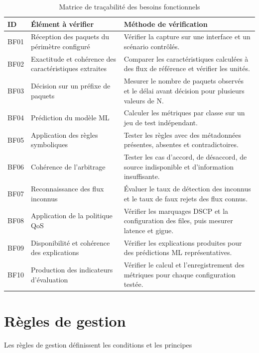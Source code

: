 \begin{table}[H]
\centering
\caption{Matrice de traçabilité des besoins fonctionnels}
\label{tab:tracabilite-bf}
\small
\begin{tabularx}{\textwidth}{|p{1.2cm}|X|X|}
\hline
\textbf{ID} & \textbf{Élément à vérifier} & \textbf{Méthode de vérification} \\
\hline
BF01 & Réception des paquets du périmètre configuré &
Vérifier la capture sur une interface et un scénario contrôlés. \\
\hline
BF02 & Exactitude et cohérence des caractéristiques extraites &
Comparer les caractéristiques calculées à des flux de référence et vérifier les unités. \\
\hline
BF03 & Décision sur un préfixe de paquets &
Mesurer le nombre de paquets observés et le délai avant décision pour plusieurs valeurs de N. \\
\hline
BF04 & Prédiction du modèle ML &
Calculer les métriques par classe sur un jeu de test indépendant. \\
\hline
BF05 & Application des règles symboliques &
Tester les règles avec des métadonnées présentes, absentes et contradictoires. \\
\hline
BF06 & Cohérence de l'arbitrage &
Tester les cas d'accord, de désaccord, de source indisponible et d'information insuffisante. \\
\hline
BF07 & Reconnaissance des flux inconnus &
Évaluer le taux de détection des inconnus et le taux de faux rejets des flux connus. \\
\hline
BF08 & Application de la politique QoS &
Vérifier les marquages DSCP et la configuration des files, puis mesurer latence et gigue. \\
\hline
BF09 & Disponibilité et cohérence des explications &
Vérifier les explications produites pour des prédictions ML représentatives. \\
\hline
BF10 & Production des indicateurs d'évaluation &
Vérifier le calcul et l'enregistrement des métriques pour chaque configuration testée. \\
\hline
\end{tabularx}
\end{table}


\section{Règles de gestion}



Les règles de gestion définissent les conditions et les principes

